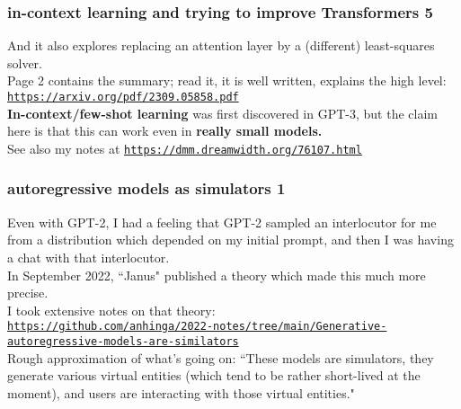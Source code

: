 \documentclass{beamer}
\newcommand{\msblue}[1]{{\color{myblue} #1}}
\begin{document}
\begin{frame}

  \frametitle{in-context learning and trying to improve Transformers 5}

And it also explores replacing an attention layer by a (different)
least-squares solver.\\[2ex]

Page 2 contains the summary; read it, it is well written, explains the high level:
\msblue{\href{https://arxiv.org/pdf/2309.05858.pdf}{\tt\small https://arxiv.org/pdf/2309.05858.pdf}}\\[2ex]

{\bf In-context/few-shot learning} was first discovered in GPT-3, but the claim here
is that this can work even in {\bf really small models.}\\[2ex]

See also my notes at
\href{https://dmm.dreamwidth.org/76107.html}{\tt\small https://dmm.dreamwidth.org/76107.html}

\end{frame}

\begin{frame}

  \frametitle{autoregressive models as simulators 1}

Even with GPT-2, I had a feeling that GPT-2 sampled an interlocutor for me from
a distribution which depended on my initial prompt, and then I was having a chat with that interlocutor.\\[2ex]

In September 2022, ``Janus" published a theory which made this much more precise.\\[2ex]

I took extensive notes on that theory:\\[2ex]

\href{https://github.com/anhinga/2022-notes/tree/main/Generative-autoregressive-models-are-similators}{\tt\tiny https://github.com/anhinga/2022-notes/tree/main/Generative-autoregressive-models-are-similators}\\[2ex]

Rough approximation of what's going on: ``These models are simulators,
they generate various virtual entities (which tend to be rather short-lived at the moment), and users are interacting with those virtual entities."

\end{frame}
\end{document}
